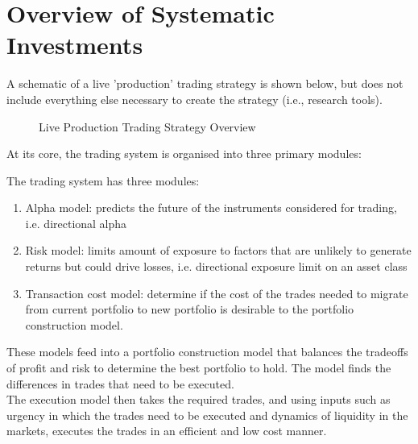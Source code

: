 \section{Overview of Systematic Investments}

A schematic of a live 'production' trading strategy is shown below, but does not include everything else necessary to create the strategy (i.e., research tools).

\begin{figure}[H]
\centering

\caption{Live Production Trading Strategy Overview}
\end{figure}

At its core, the trading system is organised into three primary modules:

The trading system has three modules:
\begin{enumerate}[label=\roman*.]
	\item Alpha model: predicts the future of the instruments considered for trading, i.e. directional alpha
	\item Risk model: limits amount of exposure to factors that are unlikely to generate returns but could drive losses, i.e. directional exposure limit on an asset class
	\item Transaction cost model: determine if the cost of the trades needed to migrate from current portfolio to new portfolio is desirable to the portfolio construction model.
\end{enumerate}
These models feed into a portfolio construction model that balances the tradeoffs of profit and risk to determine the best portfolio to hold. The model finds the differences in trades that need to be executed.\\
The execution model then takes the required trades, and using inputs such as urgency in which the trades need to be executed and dynamics of liquidity in the markets, executes the trades in an efficient and low cost manner.\\


